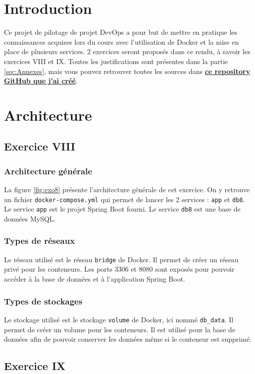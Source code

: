 \section{Introduction}
Ce projet de pilotage de projet DevOps a pour but de mettre en pratique les connaissances acquises lors du cours avec l'utilisation de Docker et la mise en place de plusieurs services. 2 exercices seront proposés dans ce rendu, à savoir les exercices VIII et IX.
Toutes les justifications sont présentes dans la partie \ref{sec:Annexes}, mais vous pouvez retrouver toutes les sources dans \href{https://github.com/RemiSaurel/docker-homework}{\textbf{ce repository GitHub que j'ai créé}}.

\section{Architecture}
\subsection{Exercice VIII}
\subsubsection*{Architecture générale}
La figure \ref{fig:exo8} présente l'architecture générale de cet exercice. On y retrouve un fichier \verb|docker-compose.yml| qui permet de lancer les 2 services : \verb|app| et \verb|db8|. Le service \verb|app| est le projet Spring Boot fourni. Le service \verb|db8| est une base de données MySQL.

\subsubsection*{Types de réseaux}
Le réseau utilisé est le réseau \verb|bridge| de Docker. Il permet de créer un réseau privé pour les conteneurs. Les ports 3306 et 8080 sont exposés pour pouvoir accéder à la base de données et à l'application Spring Boot.
\subsubsection*{Types de stockages}
Le stockage utilisé est le stockage \verb|volume| de Docker, ici nommé \verb|db_data|. Il permet de créer un volume pour les conteneurs. Il est utilisé pour la base de données afin de pouvoir conserver les données même si le conteneur est supprimé.

\subsection{Exercice IX}
